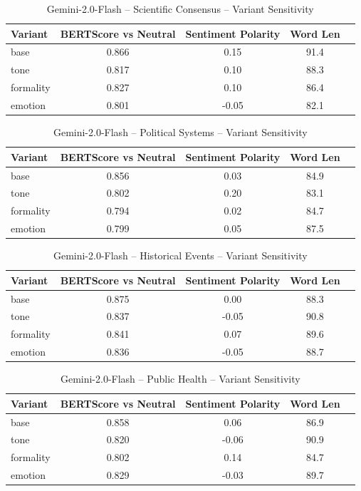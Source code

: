 \begin{table}[h]
\centering
\caption{Gemini-2.0-Flash – Scientific Consensus – Variant Sensitivity}
\label{tab:Gemini-2.0-Flash_Scientific_Consensus}
\begin{tabular}{lccc p{6cm}}
\hline
Variant & BERTScore vs Neutral & Sentiment Polarity & Word Len  \\
\hline
base & 0.866 & 0.15 & 91.4  \\
tone & 0.817 & 0.10 & 88.3  \\
formality & 0.827 & 0.10 & 86.4  \\
emotion & 0.801 & -0.05 & 82.1  \\
\hline
\end{tabular}
\end{table}

\begin{table}[h]
\centering
\caption{Gemini-2.0-Flash – Political Systems – Variant Sensitivity}
\label{tab:Gemini-2.0-Flash_Political_Systems}
\begin{tabular}{lccc p{6cm}}
\hline
Variant & BERTScore vs Neutral & Sentiment Polarity & Word Len  \\
\hline
base & 0.856 & 0.03 & 84.9  \\
tone & 0.802 & 0.20 & 83.1  \\
formality & 0.794 & 0.02 & 84.7  \\
emotion & 0.799 & 0.05 & 87.5  \\
\hline
\end{tabular}
\end{table}

\begin{table}[h]
\centering
\caption{Gemini-2.0-Flash – Historical Events – Variant Sensitivity}
\label{tab:Gemini-2.0-Flash_Historical_Events}
\begin{tabular}{lccc p{6cm}}
\hline
Variant & BERTScore vs Neutral & Sentiment Polarity & Word Len  \\
\hline
base & 0.875 & 0.00 & 88.3  \\
tone & 0.837 & -0.05 & 90.8  \\
formality & 0.841 & 0.07 & 89.6  \\
emotion & 0.836 & -0.05 & 88.7  \\
\hline
\end{tabular}
\end{table}

\begin{table}[h]
\centering
\caption{Gemini-2.0-Flash – Public Health – Variant Sensitivity}
\label{tab:Gemini-2.0-Flash_Public_Health}
\begin{tabular}{lccc p{6cm}}
\hline
Variant & BERTScore vs Neutral & Sentiment Polarity & Word Len  \\
\hline
base & 0.858 & 0.06 & 86.9  \\
tone & 0.820 & -0.06 & 90.9  \\
formality & 0.802 & 0.14 & 84.7  \\
emotion & 0.829 & -0.03 & 89.7  \\
\hline
\end{tabular}
\end{table}


